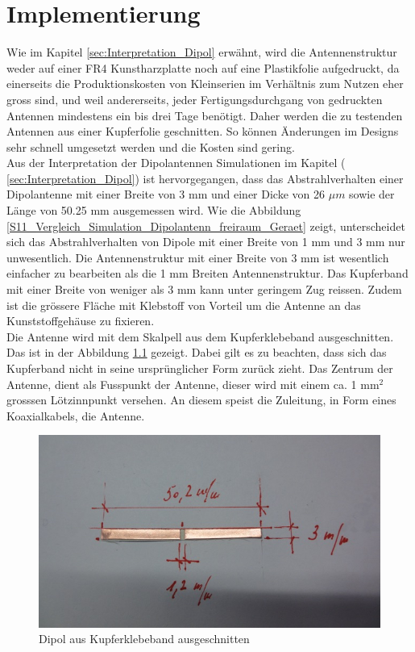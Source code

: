 \newpage 
\thispagestyle{empty}
\chapter{Implementierung}\label{sec:Implementierung}
Wie im Kapitel \ref{sec:Interpretation_Dipol} erwähnt, wird die Antennenstruktur weder auf einer FR4 Kunstharzplatte noch auf eine Plastikfolie aufgedruckt, da einerseits die Produktionskosten von Kleinserien im Verhältnis zum Nutzen eher gross sind, und weil andererseits, jeder Fertigungsdurchgang von gedruckten Antennen mindestens ein bis drei Tage benötigt. Daher werden die zu testenden Antennen aus einer Kupferfolie geschnitten. So können Änderungen im Designs sehr schnell umgesetzt werden und die Kosten sind gering.\\

Aus der Interpretation der Dipolantennen Simulationen im Kapitel ( \ref{sec:Interpretation_Dipol}) ist hervorgegangen, dass das Abstrahlverhalten einer Dipolantenne mit einer Breite von 3 mm und einer Dicke von 26 $\mu m$ sowie der Länge von 50.25 mm ausgemessen wird. Wie die Abbildung \ref{S11_Vergleich_Simulation_Dipolantenn_freiraum_Geraet} zeigt, unterscheidet sich das Abstrahlverhalten von Dipole mit einer Breite von 1 mm und 3 mm nur unwesentlich. Die Antennenstruktur mit einer Breite von 3 mm ist wesentlich einfacher zu bearbeiten als die 1 mm Breiten Antennenstruktur. Das Kupferband mit einer Breite von weniger als 3 mm kann unter geringem Zug reissen. Zudem ist die grössere Fläche mit Klebstoff von Vorteil um die Antenne an das Kunststoffgehäuse zu fixieren.  \\

Die Antenne wird mit dem Skalpell aus dem Kupferklebeband ausgeschnitten. Das ist in der Abbildung \ref{fig:DipolausKupferband} gezeigt. Dabei gilt es zu beachten, dass sich das Kupferband nicht in seine ursprünglicher Form zurück zieht. Das Zentrum der Antenne, dient als Fusspunkt der Antenne, dieser wird mit einem ca. 1 mm$^{2}$ grosssen Lötzinnpunkt versehen. An diesem speist die Zuleitung, in Form eines Koaxialkabels, die Antenne.\\
\begin{figure}[!ht]
	\centering
	\includegraphics[width=13cm]{content/bilder/Implementierung/Dipol3mm50mm.jpg}%
	\caption{Dipol aus Kupferklebeband ausgeschnitten}
	\label{fig:DipolausKupferband}
\end{figure}

